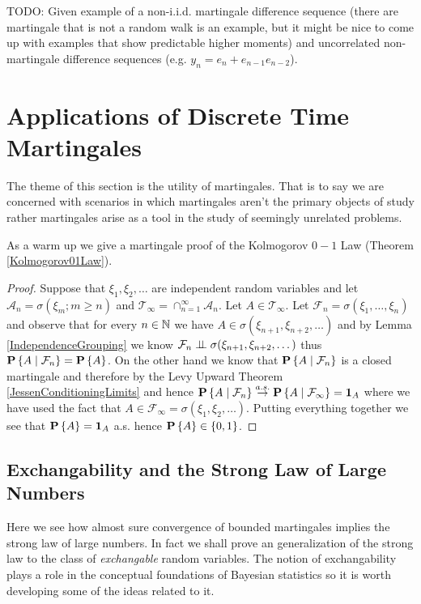 TODO: Given example of a non-i.i.d. martingale difference sequence (there are martingale that is not a random walk is an example, but it might be nice to come up with examples that show predictable higher moments) and uncorrelated non-martingale difference sequences (e.g. $y_n = e_n + {e_{n-1} e_{n-2}}$).

\section {Applications of Discrete Time Martingales}

The theme of this section is the utility of martingales.  That is to
say we are concerned with scenarios in which martingales aren't the
primary objects of study rather martingales arise as a tool in the study of
seemingly unrelated problems.

As a warm up we give a martingale proof of the Kolmogorov $0-1$ Law
(Theorem \ref{Kolmogorov01Law}).
\begin{proof}
Suppose that $\xi_1, \xi_2, \dotsc$ are independent random variables
and let $\mathcal{A}_n = \sigma(\xi_m; m \geq n)$ and
$\mathcal{T}_\infty = \cap_{n =1}^\infty \mathcal{A}_n$.  Let $A \in
\mathcal{T}_\infty$.  Let $\mathcal{F}_n = \sigma(\xi_1, \dotsc,
\xi_n)$ and observe that for every $n \in \naturals$ we have $A \in
\sigma(\xi_{n+1}, \xi_{n+2}, \dotsc)$ and by Lemma \ref{IndependenceGrouping} we know
$\mathcal{F}_n \Independent \sigma(\xi_{n+1}, \xi_{n+2}, \dotsc)$ thus
$\cprobability{\mathcal{F}_n}{A} = \probability{A}$.  On the other
hand we know that $\cprobability{\mathcal{F}_n}{A}$ is a closed
martingale and therefore by the Levy Upward Theorem
\ref{JessenConditioningLimits} and hence
$\cprobability{\mathcal{F}_n}{A} \toas
\cprobability{\mathcal{F}_\infty}{A} = \characteristic{A}$ where we have
used the fact that $A \in \mathcal{F}_\infty = \sigma(\xi_1, \xi_2,
\dotsc)$.  Putting everything together we see that $\probability{A} =
\characteristic{A}$ a.s. hence $\probability{A}  \in \lbrace 0,1 \rbrace$.
\end{proof}

\subsection{Exchangability and the Strong Law of Large Numbers}

Here we see how almost sure convergence of bounded martingales implies the strong law of large
numbers.  In fact we shall prove an generalization of the strong law to the class of 
\emph{exchangable} random variables.  The notion of exchangability plays a role in the
conceptual foundations of Bayesian statistics so it is worth developing some of the ideas
related to it.

